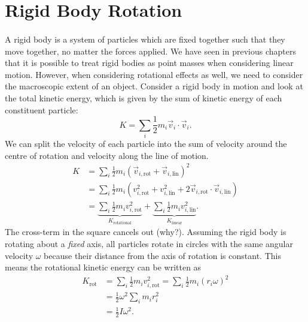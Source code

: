 \documentclass[../classical_mechanics.tex]{subfiles}
\begin{document}
    \section{Rigid Body Rotation}
        \paragraph{}
        A rigid body is a system of particles which are fixed together such that they move together, no matter the forces applied.
        We have seen in previous chapters that it is possible to treat rigid bodies as point masses when considering linear motion.
        However, when considering rotational effects as well, we need to consider the macroscopic extent of an object.
        Consider a rigid body in motion and look at the total kinetic energy, which is given by the sum of kinetic energy of each constituent particle:
        \begin{equation}
            K=\sum_i\frac{1}{2}m_i\vec{v}_i\cdot\vec{v}_i.
        \end{equation}
        We can split the velocity of each particle into the sum of velocity around the centre of rotation and velocity along the line of motion.
        \begin{align}
            K&=\sum_i\frac{1}{2}m_i(\vec{v}_{i,\text{rot}}+\vec{v}_{i,\text{lin}})^2\\
            &=\sum_i\frac{1}{2}m_i(v_{i,\text{rot}}^2+v_{i,\text{lin}}^2+2\vec{v}_{i,\text{rot}}\cdot\vec{v}_{i,\text{lin}})\\
            &=\underbrace{\sum_i\frac{1}{2}m_iv_{i,\text{rot}}^2}_{K_\text{rotational}}+\underbrace{\sum_i\frac{1}{2}m_iv_{i,\text{lin}}^2}_{K_\text{linear}}.
        \end{align}
        The cross-term in the square cancels out (why?).
        Assuming the rigid body is rotating about a \textit{fixed} axis, all particles rotate in circles with the same angular velocity $\omega$ because their distance from the axis of rotation is constant.
        This means the rotational kinetic energy can be written as
        \begin{align}
            K_\text{rot}&=\sum_i\frac{1}{2}m_iv_{i,\text{rot}}^2=\sum_i\frac{1}{2}m_i(r_i\omega)^2\\
            &=\frac{1}{2}\omega^2\sum_i m_ir_i^2\\
            &=\frac{1}{2}I\omega^2.
        \end{align}
\end{document}
